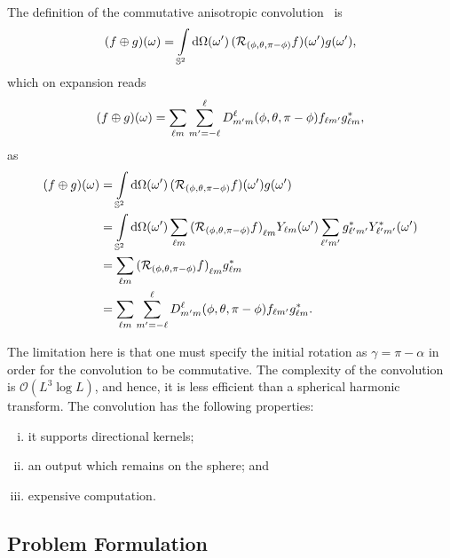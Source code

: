 The definition of the commutative anisotropic convolution~\autocite{Sadeghi2012,Khalid2012} is
%
\begin{equation}
	\pixel{(f \oplus g)}
	= \integrateSphere{\omega'} \pixel[']{(\rotation{(\phi,\theta,\pi-\phi)}f)} \pixel[']{g},
\end{equation}
%
which on expansion reads
%
\begin{equation}
	\pixel{(f \oplus g)}
	= \harmonicSum \sum\limits_{m'=-\ell}^{\ell} \wigner{\ell}{m'}{m}(\phi,\theta,\pi-\phi) f_{\ell m'} \conj{\harmonic{g}},
\end{equation}
%
as
%
\begin{align}
	\pixel{(f \oplus g)}
	 & = \integrateSphere{\omega'} \pixel[']{(\rotation{(\phi,\theta,\pi-\phi)}f)} \pixel[']{g} \nonumber{}                                                                                                  \\
	 & = \integrateSphere{\omega'} \harmonicSum \harmonic{(\rotation{(\phi,\theta,\pi-\phi)}f)} \pixel[']{\harmonic{Y}} \harmonicSum['] \conj{\harmonic[']{g}} \pixel[']{\conj{\harmonic[']{Y}}} \nonumber{} \\
	 & = \harmonicSum \harmonic{(\rotation{(\phi,\theta,\pi-\phi)}f)} \conj{\harmonic{g}} \nonumber{}                                                                                                        \\
	 & = \harmonicSum \sum\limits_{m'=-\ell}^{\ell} \wigner{\ell}{m'}{m}(\phi,\theta,\pi-\phi) f_{\ell m'} \conj{\harmonic{g}}.
\end{align}

The limitation here is that one must specify the initial rotation as \({\gamma=\pi-\alpha}\) in order for the convolution to be commutative.
The complexity of the convolution is \(\mathcal{O}(L^{3}\log{L})\), and hence, it is less efficient than a spherical harmonic transform.
The convolution has the following properties:
%
\begin{enumerate}[(i),nosep]
	\item it supports directional kernels;
	\item an output which remains on the sphere; and
	\item expensive computation.
\end{enumerate}

\subsection{Problem Formulation}

